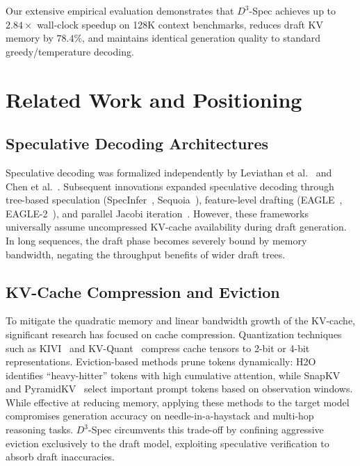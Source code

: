 \documentclass[runningheads]{llncs}
\begin{document}
Our extensive empirical evaluation demonstrates that $D^3$-Spec achieves up to $2.84\times$ wall-clock speedup on 128K context benchmarks, reduces draft KV memory by $78.4\%$, and maintains identical generation quality to standard greedy/temperature decoding.

\section{Related Work and Positioning}
\label{sec:related_work}

\subsection{Speculative Decoding Architectures}
Speculative decoding was formalized independently by Leviathan et al.~\cite{leviathan2023fast} and Chen et al.~\cite{chen2023accelerating}. Subsequent innovations expanded speculative decoding through tree-based speculation (SpecInfer~\cite{miao2024specinfer}, Sequoia~\cite{chen2024sequoia}), feature-level drafting (EAGLE~\cite{li2024eagle}, EAGLE-2~\cite{li2024eagle2}), and parallel Jacobi iteration~\cite{santilli2023accelerating}. However, these frameworks universally assume uncompressed KV-cache availability during draft generation. In long sequences, the draft phase becomes severely bound by memory bandwidth, negating the throughput benefits of wider draft trees.

\subsection{KV-Cache Compression and Eviction}
To mitigate the quadratic memory and linear bandwidth growth of the KV-cache, significant research has focused on cache compression. Quantization techniques such as KIVI~\cite{liu2024kivi} and KV-Quant~\cite{hooper2024kvquant} compress cache tensors to 2-bit or 4-bit representations. Eviction-based methods prune tokens dynamically: H2O~\cite{zhang2024h2o} identifies ``heavy-hitter'' tokens with high cumulative attention, while SnapKV~\cite{li2024snapkv} and PyramidKV~\cite{cai2024pyramidkv} select important prompt tokens based on observation windows. While effective at reducing memory, applying these methods to the target model compromises generation accuracy on needle-in-a-haystack and multi-hop reasoning tasks. $D^3$-Spec circumvents this trade-off by confining aggressive eviction exclusively to the draft model, exploiting speculative verification to absorb draft inaccuracies.
\end{document}
